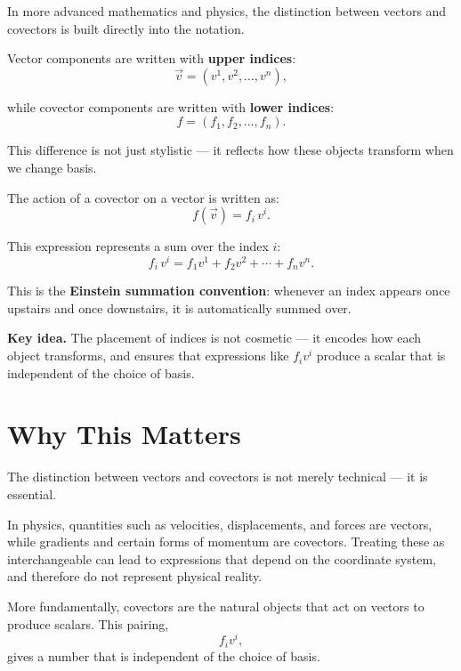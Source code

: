 \documentclass[11pt,openany]{book}
\theoremstyle{definition}
\begin{document}
In more advanced mathematics and physics, the distinction between vectors and 
covectors is built directly into the notation.

\medskip

Vector components are written with \textbf{upper indices}:
\[
\vec{v} = (v^1, v^2, \ldots, v^n),
\]

while covector components are written with \textbf{lower indices}:
\[
f = (f_1, f_2, \ldots, f_n).
\]

\medskip

This difference is not just stylistic --- it reflects how these objects transform 
when we change basis.

\medskip

The action of a covector on a vector is written as:
\[
f(\vec{v}) = f_i\, v^i.
\]

\medskip

This expression represents a sum over the index $i$:
\[
f_i\, v^i = f_1 v^1 + f_2 v^2 + \cdots + f_n v^n.
\]

\medskip

This is the \textbf{Einstein summation convention}: whenever an index appears 
once upstairs and once downstairs, it is automatically summed over.

\medskip

\textbf{Key idea.} The placement of indices is not cosmetic --- it encodes how 
each object transforms, and ensures that expressions like $f_i v^i$ produce a 
scalar that is independent of the choice of basis.

\section{Why This Matters}

The distinction between vectors and covectors is not merely technical --- it is 
essential.

\medskip

In physics, quantities such as velocities, displacements, and forces are vectors, 
while gradients and certain forms of momentum are covectors. Treating these as 
interchangeable can lead to expressions that depend on the coordinate system, and 
therefore do not represent physical reality.

\medskip

More fundamentally, covectors are the natural objects that act on vectors to 
produce scalars. This pairing,
\[
f_i v^i,
\]
gives a number that is independent of the choice of basis.
\end{document}

